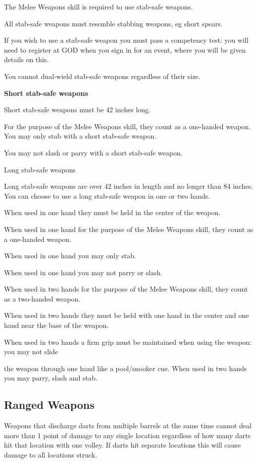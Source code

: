 \documentclass{scrbook}
\begin{document}
The Melee Weapons skill is required to use stab-safe weapons.

All stab-safe weapons must resemble stabbing weapons, eg short spears.

If you wish to use a stab-safe weapon you must pass a competency test: you will need to register at GOD when you sign in for an event, where you will be given details on this.

You cannot dual-wield stab-safe weapons regardless of their size.

\textbf{Short stab-safe weapons}

Short stab-safe weapons must be 42 inches long.

For the purpose of the Melee Weapons skill, they count as a one-handed weapon. You may only stab with a short stab-safe weapon.

You may not slash or parry with a short stab-safe weapon.

Long stab-safe weapons

Long stab-safe weapons are over 42 inches in length and no longer than 84 inches. You can choose to use a long stab-safe weapon in one or two hands.

When used in one hand they must be held in the center of the weapon.

When used in one hand for the purpose of the Melee Weapons skill, they count as a one-handed weapon.

When used in one hand you may only stab.

When used in one hand you may not parry or slash.

When used in two hands for the purpose of the Melee Weapons skill, they count as a two-handed weapon.

When used in two hands they must be held with one hand in the center and one hand near the base of the weapon.

When used in two hands a firm grip must be maintained when using the weapon: you may not slide

the weapon through one hand like a pool/snooker cue. When used in two hands you may parry, slash and stab.

\subsection{Ranged Weapons}

Weapons that discharge darts from multiple barrels at the same time cannot deal more than 1 point of damage to any single location regardless of how many darts hit that location with one volley. If darts hit separate locations this will cause damage to all locations struck.
\end{document}
